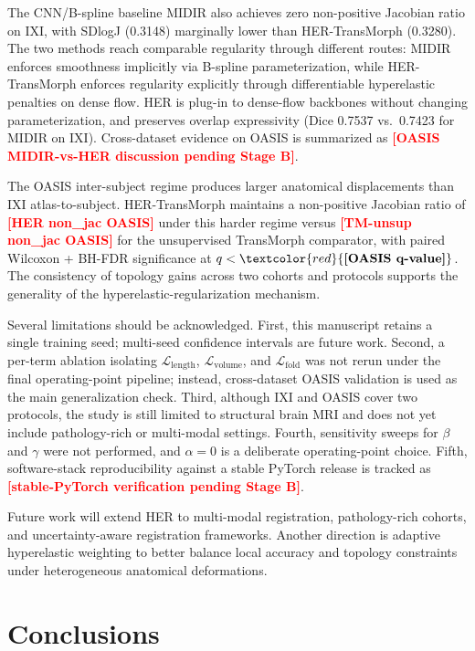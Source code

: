 \documentclass[jimaging,article,submit,pdftex,moreauthors]{Definitions/mdpi}
\providecommand{\PH}[1]{\textcolor{red}{\textbf{[#1]}}}
\begin{document}
The CNN/B-spline baseline MIDIR also achieves zero non-positive Jacobian ratio on IXI, with SDlogJ (0.3148) marginally lower than HER-TransMorph (0.3280). The two methods reach comparable regularity through different routes: MIDIR enforces smoothness implicitly via B-spline parameterization, while HER-TransMorph enforces regularity explicitly through differentiable hyperelastic penalties on dense flow. HER is plug-in to dense-flow backbones without changing parameterization, and preserves overlap expressivity (Dice 0.7537 vs.\ 0.7423 for MIDIR on IXI). Cross-dataset evidence on OASIS is summarized as \PH{OASIS MIDIR-vs-HER discussion pending Stage B}.

The OASIS inter-subject regime produces larger anatomical displacements than IXI atlas-to-subject. HER-TransMorph maintains a non-positive Jacobian ratio of \PH{HER non\_jac OASIS} under this harder regime versus \PH{TM-unsup non\_jac OASIS} for the unsupervised TransMorph comparator, with paired Wilcoxon + BH-FDR significance at \(q<\PH{OASIS q-value}\). The consistency of topology gains across two cohorts and protocols supports the generality of the hyperelastic-regularization mechanism.

Several limitations should be acknowledged. First, this manuscript retains a single training seed; multi-seed confidence intervals are future work. Second, a per-term ablation isolating \(\mathcal{L}_{\mathrm{length}}\), \(\mathcal{L}_{\mathrm{volume}}\), and \(\mathcal{L}_{\mathrm{fold}}\) was not rerun under the final operating-point pipeline; instead, cross-dataset OASIS validation is used as the main generalization check. Third, although IXI and OASIS cover two protocols, the study is still limited to structural brain MRI and does not yet include pathology-rich or multi-modal settings. Fourth, sensitivity sweeps for \(\beta\) and \(\gamma\) were not performed, and \(\alpha=0\) is a deliberate operating-point choice. Fifth, software-stack reproducibility against a stable PyTorch release is tracked as \PH{stable-PyTorch verification pending Stage B}.

Future work will extend HER to multi-modal registration, pathology-rich cohorts, and uncertainty-aware registration frameworks. Another direction is adaptive hyperelastic weighting to better balance local accuracy and topology constraints under heterogeneous anatomical deformations.

\section{Conclusions}
\end{document}
